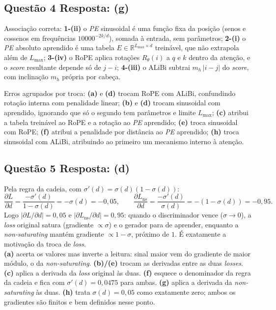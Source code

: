 \documentclass[11pt,a4paper]{article}
\begin{document}
\subsection*{Questão 4 \textemdash{} Resposta: (g)}
Associação correta: \textbf{1-(ii)} o \textit{PE} sinusoidal é uma função fixa da posição (senos e cossenos em frequências $10000^{-2k/d}$), somada à entrada, sem parâmetros; \textbf{2-(i)} o \textit{PE} absoluto aprendido é uma tabela $E \in \mathbb{R}^{L_{\text{max}} \times d}$ treinável, que não extrapola além de $L_{\text{max}}$; \textbf{3-(iv)} o RoPE aplica rotações $R_\theta(i)$ a $q$ e $k$ dentro da atenção, e o \textit{score} resultante depende só de $j - i$; \textbf{4-(iii)} o ALiBi subtrai $m_h\,|i - j|$ do \textit{score}, com inclinação $m_h$ própria por cabeça.

Erros agrupados por troca: \textbf{(a)} e \textbf{(d)} trocam RoPE com ALiBi, confundindo rotação interna com penalidade linear; \textbf{(b)} e \textbf{(d)} trocam sinusoidal com aprendido, ignorando que só o segundo tem parâmetros e limite $L_{\text{max}}$; \textbf{(c)} atribui a tabela treinável ao RoPE e a rotação ao \textit{PE} aprendido; \textbf{(e)} troca sinusoidal com RoPE; \textbf{(f)} atribui a penalidade por distância ao \textit{PE} aprendido; \textbf{(h)} troca sinusoidal com ALiBi, atribuindo ao primeiro um mecanismo interno à atenção.

\subsection*{Questão 5 \textemdash{} Resposta: (d)}
Pela regra da cadeia, com $\sigma'(d) = \sigma(d)(1 - \sigma(d))$:
\[
\frac{\partial L}{\partial d} = \frac{-\sigma'(d)}{1 - \sigma(d)} = -\sigma(d) = -0{,}05, \qquad
\frac{\partial L_{\text{ns}}}{\partial d} = \frac{-\sigma'(d)}{\sigma(d)} = -(1 - \sigma(d)) = -0{,}95.
\]
Logo $\left|\partial L / \partial d\right| = 0{,}05$ e $\left|\partial L_{\text{ns}} / \partial d\right| = 0{,}95$: quando o discriminador vence ($\sigma \to 0$), a \textit{loss} original satura (gradiente $\propto \sigma$) e o gerador para de aprender, enquanto a \textit{non-saturating} mantém gradiente $\propto 1 - \sigma$, próximo de $1$. É exatamente a motivação da troca de \textit{loss}.\\
\textbf{(a)} acerta os valores mas inverte a leitura: sinal maior vem do gradiente de maior módulo, o da \textit{non-saturating}.
\textbf{(b)/(e)} trocam as derivadas entre as duas \textit{losses}.
\textbf{(c)} aplica a derivada da \textit{loss} original às duas.
\textbf{(f)} esquece o denominador da regra da cadeia e fica com $\sigma'(d) = 0{,}0475$ para ambas.
\textbf{(g)} aplica a derivada da \textit{non-saturating} às duas.
\textbf{(h)} trata $\sigma(d) = 0{,}05$ como exatamente zero; ambos os gradientes são finitos e bem definidos nesse ponto.
\end{document}
